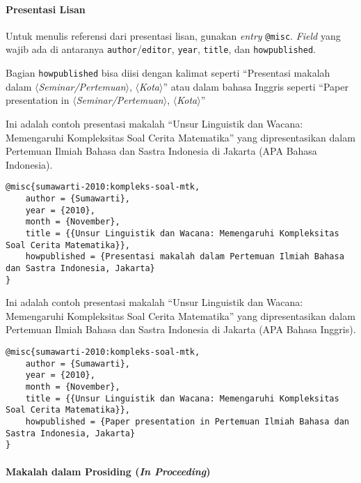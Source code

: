\paragraph{Presentasi Lisan}

Untuk menulis referensi dari presentasi lisan, gunakan \textit{entry} \texttt{@misc}. \textit{Field} yang wajib ada di antaranya \texttt{author}/\texttt{editor}, \texttt{year}, \texttt{title}, dan \texttt{howpublished}. 

Bagian \texttt{howpublished} bisa diisi dengan kalimat seperti ``Presentasi makalah dalam \linebreak $\langle$\textit{Seminar/Pertemuan}$\rangle$, $\langle$\textit{Kota}$\rangle$'' atau dalam bahasa Inggris seperti ``Paper presentation in \linebreak $\langle$\textit{Seminar/Pertemuan}$\rangle$,  $\langle$\textit{Kota}$\rangle$''

Ini adalah contoh presentasi makalah ``Unsur Linguistik dan Wacana: Memengaruhi Kompleksitas Soal Cerita Matematika'' yang dipresentasikan dalam Pertemuan Ilmiah Bahasa dan Sastra Indonesia di Jakarta (APA Bahasa Indonesia).

\begin{lstlisting}
@misc{sumawarti-2010:kompleks-soal-mtk,
    author = {Sumawarti},
    year = {2010},
    month = {November},
    title = {{Unsur Linguistik dan Wacana: Memengaruhi Kompleksitas Soal Cerita Matematika}},
    howpublished = {Presentasi makalah dalam Pertemuan Ilmiah Bahasa dan Sastra Indonesia, Jakarta}
}
\end{lstlisting}

Ini adalah contoh presentasi makalah ``Unsur Linguistik dan Wacana: Memengaruhi Kompleksitas Soal Cerita Matematika'' yang dipresentasikan dalam Pertemuan Ilmiah Bahasa dan Sastra Indonesia di Jakarta (APA Bahasa Inggris).

\begin{lstlisting}
@misc{sumawarti-2010:kompleks-soal-mtk,
    author = {Sumawarti},
    year = {2010},
    month = {November},
    title = {{Unsur Linguistik dan Wacana: Memengaruhi Kompleksitas Soal Cerita Matematika}},
    howpublished = {Paper presentation in Pertemuan Ilmiah Bahasa dan Sastra Indonesia, Jakarta}
}
\end{lstlisting}

\paragraph{Makalah dalam Prosiding (\textit{In Proceeding})}

